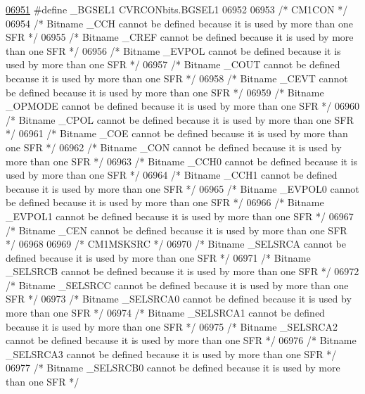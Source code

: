 \begin{DoxyCode}
\hypertarget{a00009_source_l06951}{}\hyperlink{a00009_abf9cf652cf226e2d6c834750932b9117}{06951} \textcolor{preprocessor}{#define \_BGSEL1 CVRCONbits.BGSEL1}
06952 
06953 \textcolor{comment}{/* CM1CON */}
06954 \textcolor{comment}{/* Bitname \_CCH cannot be defined because it is used by more than one SFR */}
06955 \textcolor{comment}{/* Bitname \_CREF cannot be defined because it is used by more than one SFR */}
06956 \textcolor{comment}{/* Bitname \_EVPOL cannot be defined because it is used by more than one SFR */}
06957 \textcolor{comment}{/* Bitname \_COUT cannot be defined because it is used by more than one SFR */}
06958 \textcolor{comment}{/* Bitname \_CEVT cannot be defined because it is used by more than one SFR */}
06959 \textcolor{comment}{/* Bitname \_OPMODE cannot be defined because it is used by more than one SFR */}
06960 \textcolor{comment}{/* Bitname \_CPOL cannot be defined because it is used by more than one SFR */}
06961 \textcolor{comment}{/* Bitname \_COE cannot be defined because it is used by more than one SFR */}
06962 \textcolor{comment}{/* Bitname \_CON cannot be defined because it is used by more than one SFR */}
06963 \textcolor{comment}{/* Bitname \_CCH0 cannot be defined because it is used by more than one SFR */}
06964 \textcolor{comment}{/* Bitname \_CCH1 cannot be defined because it is used by more than one SFR */}
06965 \textcolor{comment}{/* Bitname \_EVPOL0 cannot be defined because it is used by more than one SFR */}
06966 \textcolor{comment}{/* Bitname \_EVPOL1 cannot be defined because it is used by more than one SFR */}
06967 \textcolor{comment}{/* Bitname \_CEN cannot be defined because it is used by more than one SFR */}
06968 
06969 \textcolor{comment}{/* CM1MSKSRC */}
06970 \textcolor{comment}{/* Bitname \_SELSRCA cannot be defined because it is used by more than one SFR */}
06971 \textcolor{comment}{/* Bitname \_SELSRCB cannot be defined because it is used by more than one SFR */}
06972 \textcolor{comment}{/* Bitname \_SELSRCC cannot be defined because it is used by more than one SFR */}
06973 \textcolor{comment}{/* Bitname \_SELSRCA0 cannot be defined because it is used by more than one SFR */}
06974 \textcolor{comment}{/* Bitname \_SELSRCA1 cannot be defined because it is used by more than one SFR */}
06975 \textcolor{comment}{/* Bitname \_SELSRCA2 cannot be defined because it is used by more than one SFR */}
06976 \textcolor{comment}{/* Bitname \_SELSRCA3 cannot be defined because it is used by more than one SFR */}
06977 \textcolor{comment}{/* Bitname \_SELSRCB0 cannot be defined because it is used by more than one SFR */}

\end{DoxyCode}
